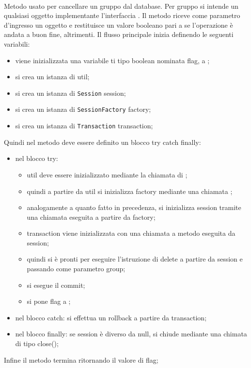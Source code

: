 \begin{description}
	\item{}\\
	Metodo usato per cancellare un gruppo dal database. Per gruppo si intende un qualsiasi oggetto implementante l'interfaccia . Il metodo riceve come parametro d'ingresso un oggetto  e restituisce un valore booleano  pari a  se l'operazione è andata a buon fine,  altrimenti. Il flusso principale inizia definendo le seguenti variabili:
	\begin{itemize}
		\item viene inizializzata una variabile ti tipo boolean nominata flag, a ;
		\item si crea un istanza di  util;
		\item si crea un istanza di \texttt{Session} session;
		\item si crea un istanza di \texttt{SessionFactory} factory;
		\item si crea un istanza di \texttt{Transaction} transaction;
	\end{itemize}
	Quindi nel metodo deve essere definito un blocco try catch finally:
	\begin{itemize}
		\item nel blocco try:
		\begin{itemize}
			\item util deve essere inizializzato mediante la chiamata  di ;
			\item quindi a partire da util si inizializza factory mediante una chiamata ;
			\item analogamente a quanto fatto in precedenza, si inizializza session tramite una chiamata  eseguita a partire da factory;
			\item transaction viene inizializzata con una chiamata a metodo  eseguita da session;
			\item quindi si è pronti per eseguire l'istruzione di delete a partire da session e passando come parametro group;
			\item si esegue il commit;
			\item si pone flag a ;
		\end{itemize}
		\item nel blocco catch: si effettua un rollback a partire da transaction;
		\item nel blocco finally: se session è diverso da null, si chiude mediante una chimata di tipo close();
	\end{itemize}
	Infine il metodo termina ritornando il valore di flag;
	

\end{description}
